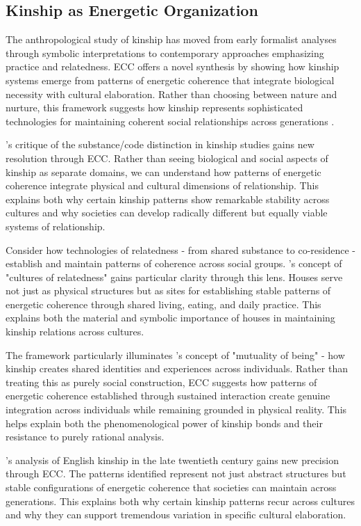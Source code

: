 \subsection{Kinship as Energetic Organization}

The anthropological study of kinship has moved from early formalist analyses through symbolic interpretations to contemporary approaches emphasizing practice and relatedness. ECC offers a novel synthesis by showing how kinship systems emerge from patterns of energetic coherence that integrate biological necessity with cultural elaboration. Rather than choosing between nature and nurture, this framework suggests how kinship represents sophisticated technologies for maintaining coherent social relationships across generations \cite{carsten2004after}.

\cite{schneider1984critique}'s critique of the substance/code distinction in kinship studies gains new resolution through ECC. Rather than seeing biological and social aspects of kinship as separate domains, we can understand how patterns of energetic coherence integrate physical and cultural dimensions of relationship. This explains both why certain kinship patterns show remarkable stability across cultures and why societies can develop radically different but equally viable systems of relationship.

Consider how technologies of relatedness - from shared substance to co-residence - establish and maintain patterns of coherence across social groups. \cite{carsten2000cultures}'s concept of "cultures of relatedness" gains particular clarity through this lens. Houses serve not just as physical structures but as sites for establishing stable patterns of energetic coherence through shared living, eating, and daily practice. This explains both the material and symbolic importance of houses in maintaining kinship relations across cultures.

The framework particularly illuminates \cite{sahlins2013what}'s concept of "mutuality of being" - how kinship creates shared identities and experiences across individuals. Rather than treating this as purely social construction, ECC suggests how patterns of energetic coherence established through sustained interaction create genuine integration across individuals while remaining grounded in physical reality. This helps explain both the phenomenological power of kinship bonds and their resistance to purely rational analysis.

\cite{strathern1992after}'s analysis of English kinship in the late twentieth century gains new precision through ECC. The patterns identified represent not just abstract structures but stable configurations of energetic coherence that societies can maintain across generations. This explains both why certain kinship patterns recur across cultures and why they can support tremendous variation in specific cultural elaboration.

